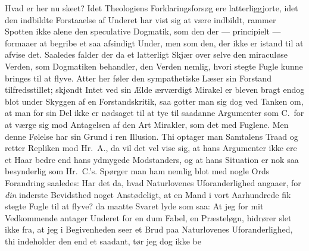Hvad er her nu skeet? Idet Theologiens Forklaringsforsøg ere latterliggjorte,
idet den indbildte Forstaaelse af Underet har vist sig at være indbildt,
rammer Spotten ikke alene den speculative Dogmatik, som den der ---
principielt --- formaaer at begribe et saa afsindigt Under, men som den, der
ikke er istand til at afvise det. Saaledes falder der da et latterligt Skjær
over selve den miraculøse Verden, som Dogmatiken behandler, den Verden nemlig,
hvori stegte Fugle kunne bringes til at flyve. Atter her føler den
sympathetiske Læser sin Forstand tilfredsstillet; skjøndt Intet ved sin Ælde
ærværdigt Mirakel er bleven bragt endog blot under Skyggen af en
Forstandskritik, saa gotter man sig dog ved Tanken om, at man for sin Del ikke
er nødsaget til at tye til saadanne Argumenter som C.\ for at værge sig mod
Antagelsen af den Art Mirakler, som det med Fuglene. Men denne Følelse har sin
Grund i ren Illusion. Thi optager man Samtalens Traad og retter Repliken mod
Hr.\ A., da vil det vel vise sig, at hans Argumenter ikke ere et Haar bedre end
hans ydmygede Modstanders, og at hans Situation er nok saa besynderlig som
Hr.\ C.'s. Spørger man ham nemlig blot med nogle Ords Forandring saaledes: Har
det da, hvad Naturlovenes Uforanderlighed angaaer, for \emph{din} inderste
Bevidsthed noget Anstødeligt, at en Mand i vort Aarhundrede fik stegte Fugle
til at flyve? da maatte Svaret lyde som saa: At jeg for mit Vedkommende antager
Underet for en dum Fabel, en Præsteløgn, hidrører slet ikke fra, at jeg i
Begivenheden seer et Brud paa Naturlovenes Uforanderlighed, thi indeholder den
end et saadant, tør jeg dog ikke be\-%
